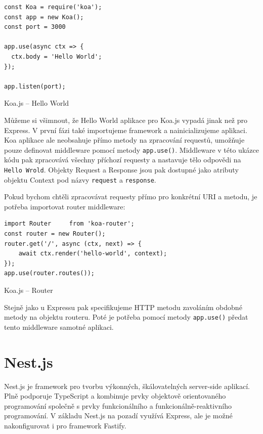\documentclass[thesis=M,czech]{FITthesis}[2019/12/23]
\begin{document}
\begin{listing}[H]
\begin{verbatim}
const Koa = require('koa');
const app = new Koa();
const port = 3000

app.use(async ctx => {
  ctx.body = 'Hello World';
});

app.listen(port);
\end{verbatim}
\caption{Koa.js -- Hello World}
\label{lst:koa_hello}
\end{listing}

Můžeme si všimnout, že Hello World aplikace pro Koa.js vypadá jinak než pro Express. V první fázi také importujeme framework a nainicializujeme aplikaci. Koa aplikace ale neobsahuje přímo metody na zpracování requestů, umožňuje pouze definovat middleware pomocí metody \texttt{app.use()}. Middleware v této ukázce kódu pak zpracovává všechny příchozí requesty a nastavuje tělo odpovědi na \texttt{Hello Wrold}. Objekty Request a Response jsou pak dostupné jako atributy objektu Context pod názvy \texttt{request} a \texttt{response}.

Pokud bychom chtěli zpracovávat requesty přímo pro konkrétní URI a metodu, je potřeba importovat router middleware:

\begin{listing}[H]
\begin{verbatim}
import Router     from 'koa-router';
const router = new Router();
router.get('/', async (ctx, next) => {
    await ctx.render('hello-world', context);
});
app.use(router.routes());
\end{verbatim}
\caption{Koa.js -- Router}
\label{lst:koa_router}
\end{listing}

Stejně jako u Expressu pak specifikujeme HTTP metodu zavoláním obdobné metody na objektu routeru. Poté je potřeba pomocí metody \texttt{app.use()} předat tento middleware samotné aplikaci.

\section{Nest.js}
Nest.js je framework pro tvorbu výkonných, škálovatelných server-side aplikací. Plně podporuje TypeScript a kombinuje prvky objektově orientovaného programování společně s prvky funkcionálního a funkcionálně-reaktivního programování. V základu Nest.js na pozadí využívá Express, ale je možné nakonfigurovat i pro framework Fastify.
\end{document}
